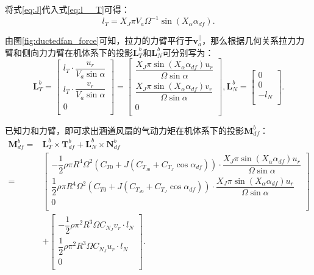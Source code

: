将式\eqref{eq:J}代入式\eqref{eq:l__T}可得：
\begin{equation}
    l_T = X_J \pi V_a \Omega ^{-1} \sin(X_\alpha \alpha_{df}).
    \label{eq:l_T}
\end{equation}

由图\ref{fig:ductedfan_force}可知，拉力的力臂平行于$\boldsymbol{v}_a^{||}$，那么根据几何关系拉力力臂和侧向力力臂在机体系下的投影$\boldsymbol{L}_T^b$和$\boldsymbol{L}_N^b$可分别写为：
\begin{equation}
    \boldsymbol{L}_T^b = 
    \begin{bmatrix}
        l_T \cdot \dfrac{u_r}{V_a \sin\alpha} \\[8pt]
        l_T \cdot \dfrac{v_r}{V_a \sin\alpha} \\[8pt]
        0 \\[8pt]
    \end{bmatrix} = 
    \begin{bmatrix}
        \dfrac{X_J \pi \sin(X_\alpha \alpha_{df}) u_r}{\Omega \sin\alpha} \\[8pt]
        \dfrac{X_J \pi \sin(X_\alpha \alpha_{df}) v_r}{\Omega \sin\alpha} \\[8pt]
        0 \\[8pt]
    \end{bmatrix},
    \boldsymbol{L}_N^b = 
    \begin{bmatrix}
        0 \\[8pt]
        0 \\[8pt]
        -l_N \\[8pt]
    \end{bmatrix}.
\end{equation}

已知力和力臂，即可求出涵道风扇的气动力矩在机体系下的投影$\boldsymbol{M}_{df}^b$：
\begin{equation}
    \begin{aligned}
        \boldsymbol{M}_{df}^b = &\boldsymbol{L}_T^b \times \boldsymbol{T}_{df}^b + \boldsymbol{L}_N^b \times \boldsymbol{N}_{df}^b \\
        =
        &\begin{bmatrix}
            -\dfrac{1}{2}\rho \pi R^4 \Omega^2 (C_{T0} + J (C_{T_{J0}} + C_{T_J} \cos\alpha_{df})) \cdot \dfrac{X_J \pi \sin(X_\alpha \alpha_{df}) u_r}{\Omega \sin\alpha} \\[8pt]
            \dfrac{1}{2}\rho \pi R^4 \Omega^2 (C_{T0} + J (C_{T_{J0}} + C_{T_J} \cos\alpha_{df})) \cdot \dfrac{X_J \pi \sin(X_\alpha \alpha_{df}) u_r}{\Omega \sin\alpha} \\[8pt]
            0 \\[8pt]
        \end{bmatrix} \\
        &+ \begin{bmatrix}
            - \dfrac{1}{2}\rho \pi^2 R^3 \Omega C_{N_J} v_r \cdot l_N \\[8pt]
            \dfrac{1}{2}\rho \pi^2 R^3 \Omega C_{N_J} u_r \cdot l_N \\[8pt]
            0 \\[8pt]
        \end{bmatrix}.
    \end{aligned}
\end{equation}

